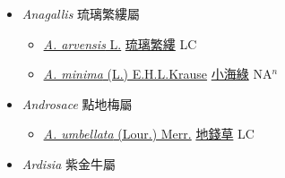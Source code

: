 
  \begin{itemize}
 \item[] \textit{Anagallis} 琉璃繁縷屬
                    
  \begin{itemize}
        \item[] \href{http://www.theplantlist.org/tpl1.1/search?q=Anagallis+arvensis}{\textit{A. arvensis} L.}   \href{\detokenize{http://taibnet.sinica.edu.tw/chi/taibnet_species_list.php?T2=琉璃繁縷&T2_new_value=true&fr=y}}{琉璃繁縷} LC
        \item[] \href{http://www.theplantlist.org/tpl1.1/search?q=Anagallis+minima}{\textit{A. minima} (L.) E.H.L.Krause}   \href{\detokenize{http://taibnet.sinica.edu.tw/chi/taibnet_species_list.php?T2=小海綠&T2_new_value=true&fr=y}}{小海綠} NA$^n$
  \end{itemize}
 \item[] \textit{Androsace} 點地梅屬
                    
  \begin{itemize}
        \item[] \href{http://www.theplantlist.org/tpl1.1/search?q=Androsace+umbellata}{\textit{A. umbellata} (Lour.) Merr.}   \href{\detokenize{http://taibnet.sinica.edu.tw/chi/taibnet_species_list.php?T2=地錢草&T2_new_value=true&fr=y}}{地錢草} LC
  \end{itemize}
 \item[] \textit{Ardisia} 紫金牛屬
                    

\end{itemize}

